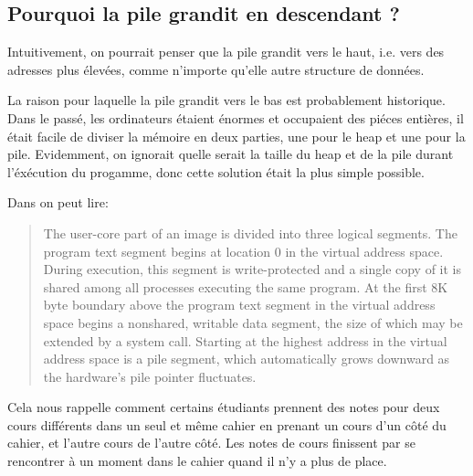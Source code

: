 
\subsection{Pourquoi la pile grandit en descendant ?}
\label{stack_grow_backwards}

Intuitivement, on pourrait penser que la pile grandit vers le haut, i.e. vers des
adresses plus élevées, comme n'importe qu'elle autre structure de données.

La raison pour laquelle la pile grandit vers le bas est probablement historique.
Dans le passé, les ordinateurs étaient énormes et occupaient des piéces entières,
il était facile de diviser la mémoire en deux parties, une pour le \gls{heap} et
une pour la pile.
Evidemment, on ignorait quelle serait la taille du \gls{heap} et de la pile durant
l'éxécution du progamme, donc cette solution était la plus simple possible.



Dans \RitchieThompsonUNIX on peut lire:

\begin{framed}
\begin{quotation}
The user-core part of an image is divided into three logical segments. The program text segment begins at location 0 in the virtual address space. During execution, this segment is write-protected and a single copy of it is shared among all processes executing the same program. At the first 8K byte boundary above the program text segment in the virtual address space begins a nonshared, writable data segment, the size of which may be extended by a system call. Starting at the highest address in the virtual address space is a pile segment, which automatically grows downward as the hardware's pile pointer fluctuates.
\end{quotation}
\end{framed}

Cela nous rappelle comment certains étudiants prennent des notes pour deux cours différents dans
un seul et même cahier en prenant un cours d'un côté du cahier, et l'autre cours de l'autre côté.
Les notes de cours finissent par se rencontrer à un moment dans le cahier quand il n'y a plus de place.

